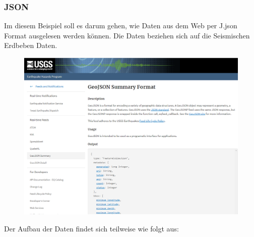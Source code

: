 \subsubsection{JSON}
Im diesem Beispiel soll es darum gehen, wie Daten aus dem Web per \gls{J.json} Format ausgelesen werden können. 
Die Daten beziehen sich auf die Seismischen Erdbeben Daten.
\begin{figure}[H]
	\centering
	\includegraphics[scale = 0.3]{attachment/chapter_3/Scc073}
\end{figure}
Der Aufbau der Daten findet sich teilweise wie folgt aus:

